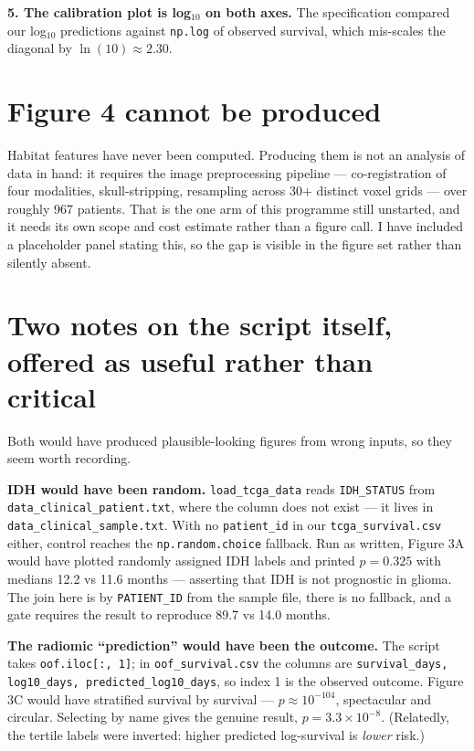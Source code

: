 \documentclass[11pt,a4paper]{article}
\begin{document}
\textbf{5. The calibration plot is log$_{10}$ on both axes.} The specification compared our
log$_{10}$ predictions against \texttt{np.log} of observed survival, which mis-scales the
diagonal by $\ln(10) \approx 2.30$.

\section{Figure 4 cannot be produced}

Habitat features have never been computed. Producing them is not an analysis of data in hand: it
requires the image preprocessing pipeline --- co-registration of four modalities,
skull-stripping, resampling across 30+ distinct voxel grids --- over roughly 967 patients. That is
the one arm of this programme still unstarted, and it needs its own scope and cost estimate
rather than a figure call. I have included a placeholder panel stating this, so the gap is
visible in the figure set rather than silently absent.

\section{Two notes on the script itself, offered as useful rather than critical}

Both would have produced plausible-looking figures from wrong inputs, so they seem worth
recording.

\textbf{IDH would have been random.} \texttt{load\_tcga\_data} reads \texttt{IDH\_STATUS} from
\texttt{data\_clinical\_patient.txt}, where the column does not exist --- it lives in
\texttt{data\_clinical\_sample.txt}. With no \texttt{patient\_id} in our
\texttt{tcga\_survival.csv} either, control reaches the
\texttt{np.random.choice} fallback. Run as written, Figure 3A would have plotted randomly
assigned IDH labels and printed $p = 0.325$ with medians 12.2 vs 11.6 months --- asserting that
IDH is not prognostic in glioma. The join here is by \texttt{PATIENT\_ID} from the sample file,
there is no fallback, and a gate requires the result to reproduce 89.7 vs 14.0 months.

\textbf{The radiomic ``prediction'' would have been the outcome.} The script takes
\texttt{oof.iloc[:, 1]}; in \texttt{oof\_survival.csv} the columns are
\texttt{survival\_days, log10\_days, predicted\_log10\_days}, so index 1 is the observed outcome.
Figure 3C would have stratified survival by survival --- $p \approx 10^{-104}$, spectacular and
circular. Selecting by name gives the genuine result, $p = 3.3\times10^{-8}$. (Relatedly, the
tertile labels were inverted: higher predicted log-survival is \emph{lower} risk.)
\end{document}
